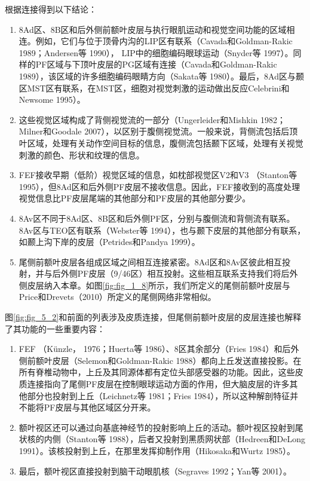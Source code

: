 根据连接得到以下结论：

\begin{enumerate}
	\item 8Ad区、8B区和后外侧前额叶皮层与执行眼肌运动和视觉空间功能的区域相连。例如，它们与位于顶骨内沟的LIP区有联系（Cavada和Goldman-Rakic 1989；Andersen等 1990）， LIP中的细胞编码眼球运动（Snyder等 1997）。同样的PF区域与下顶叶皮层的PG区域有连接（Cavada和Goldman-Rakic 1989），该区域的许多细胞编码眼睛方向（Sakata等 1980）。最后，8Ad区与颞区MST区有联系，在MST区，细胞对视觉刺激的运动做出反应Celebrini和Newsome 1995）。
	\item 这些视觉区域构成了背侧视觉流的一部分（Ungerleider和Mishkin 1982；Milner和Goodale 2007），以区别于腹侧视觉流。一般来说，背侧流包括后顶叶区域，处理有关动作空间目标的信息，腹侧流包括颞下区域，处理有关视觉刺激的颜色、形状和纹理的信息。
	\item FEF接收早期（低阶）视觉区域的信息，如枕部视觉区V2和V3 （Stanton等 1995），但8Ad区和后外侧PF皮层不接收信息。因此，FEF接收到的高度处理视觉信息比PF皮层尾端的其他部分和PF皮层的其他部分要少。
	\item 8Av区不同于8Ad区、8B区和后外侧PF区，分别与腹侧流和背侧流有联系。8Av区与TEO区有联系（Webster等 1994），也与颞下皮层的其他部分有联系，如颞上沟下岸的皮层（Petrides和Pandya 1999）。
	\item 尾侧前额叶皮层各组成区域之间相互连接紧密。8Ad区和8Av区彼此相互投射，并与后外侧PF皮层（9/46区）相互投射。这些相互联系支持我们将后外侧皮层纳入本章。如图\ref{fig:fig_1_8}所示，我们所定义的尾侧前额叶皮层与Price和Drevets（2010）所定义的尾侧网络非常相似。
\end{enumerate}



图\ref{fig:fig_5_2}和前面的列表涉及皮质连接，但尾侧前额叶皮层的皮层连接也解释了其功能的一些重要内容：


\begin{enumerate}
	\item FEF （Künzle， 1976；Huerta等 1986）、8区其余部分（Fries 1984）和后外侧前额叶皮层（Selemon和Goldman-Rakic 1988）都向上丘发送直接投影。在所有脊椎动物中，上丘及其同源体都有定位头部感受器的功能。因此，这些皮质连接指向了尾侧PF皮层在控制眼球运动方面的作用，但大脑皮层的许多其他部分也投射到上丘（Leichnetz等 1981；Fries 1984），所以这种解剖特征并不能将PF皮层与其他区域区分开来。
	\item 额叶视区还可以通过向基底神经节的投射影响上丘的活动。额叶视区投射到尾状核的内侧（Stanton等 1988），后者又投射到黑质网状部（Hedreen和DeLong 1991）。该核投射到上丘，在那里发挥抑制作用（Hikosaka和Wurtz 1985）。
	\item 最后，额叶视区直接投射到脑干动眼肌核（Segraves 1992；Yan等 2001）。
\end{enumerate}



